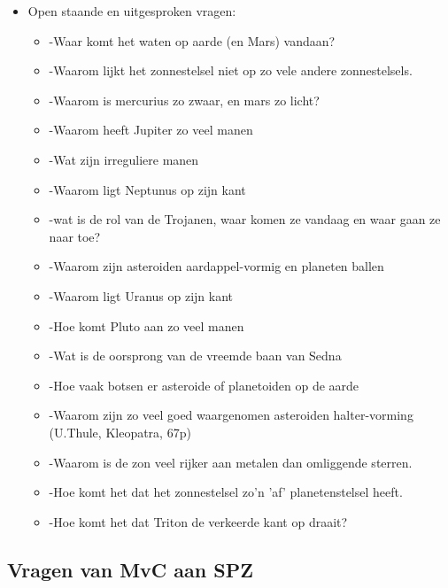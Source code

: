 \documentclass[11pt,fleqn]{book} %
\begin{document}
\begin{itemize}
\item Open staande en uitgesproken vragen:
  \begin{itemize}
  \item -Waar komt het waten op aarde (en Mars) vandaan?
  \item -Waarom lijkt het zonnestelsel niet op zo vele andere zonnestelsels.
  \item -Waarom is mercurius zo zwaar, en mars zo licht?
  \item -Waarom heeft Jupiter zo veel manen
  \item -Wat zijn irreguliere manen
  \item -Waarom ligt Neptunus op zijn kant
  \item -wat is de rol van de Trojanen, waar komen ze vandaag en waar gaan ze naar toe?
  \item -Waarom zijn asteroiden aardappel-vormig en planeten ballen
  \item -Waarom ligt Uranus op zijn kant
  \item -Hoe komt Pluto aan zo veel manen
  \item -Wat is de oorsprong van de vreemde baan van Sedna
  \item -Hoe vaak botsen er asteroide of planetoiden op de aarde
  \item -Waarom zijn zo veel goed waargenomen asteroiden halter-vorming (U.Thule, Kleopatra, 67p)
  \item -Waarom is de zon veel rijker aan metalen dan omliggende sterren.
  \item -Hoe komt het dat het zonnestelsel zo'n 'af' planetenstelsel heeft.
  \item -Hoe komt het dat Triton de verkeerde kant op draait?
  \end{itemize}
\end{itemize}

\subsection{Vragen van MvC aan SPZ}
\end{document}
